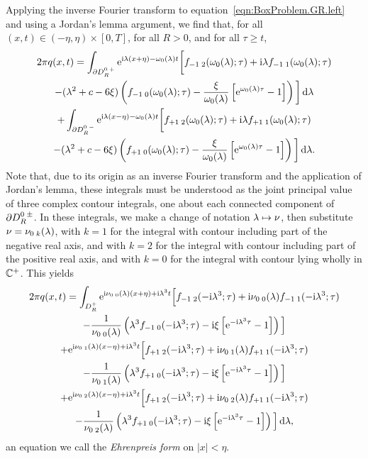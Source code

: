 \documentclass[11pt,reqno,oneside,a4paper]{article}
\begin{document}
Applying the inverse Fourier transform to equation~\eqref{eqn:BoxProblem.GR.left} and using a Jordan's lemma argument, we find that, for all $(x,t)\in(-\eta,\eta)\times[0,T]$, for all $R>0$, and for all $\tau\geq t$,
\begin{multline}
    2\pi q(x,t)
    = \int_{\partial D_{R\;}^{0\;+}} \mathrm{e}^{\mathrm{i}\lambda(x+\eta)-\omega_{0}(\lambda)t} \bigg[ f_{-1\;2}(\omega_{0}(\lambda);\tau) + \mathrm{i}\lambda f_{- 1\;1}(\omega_{0}(\lambda);\tau) \\
    - (\lambda^2+c-6\xi) \left( f_{-1\;0}(\omega_{0}(\lambda);\tau) - \frac{\xi}{\omega_0(\lambda)}\left[\mathrm{e}^{\omega_0(\lambda)\tau}-1\right] \right) \bigg] \,\mathrm{d}\lambda \\
    + \int_{\partial D_{R\;}^{0\;-}} \mathrm{e}^{\mathrm{i}\lambda(x-\eta)-\omega_{0}(\lambda)t} \bigg[ f_{+1\;2}(\omega_{0}(\lambda);\tau) + \mathrm{i}\lambda f_{+ 1\;1}(\omega_{0}(\lambda);\tau) \\
    - (\lambda^2+c-6\xi) \left( f_{+1\;0}(\omega_{0}(\lambda);\tau) - \frac{\xi}{\omega_0(\lambda)}\left[\mathrm{e}^{\omega_0(\lambda)\tau}-1\right] \right) \bigg] \,\mathrm{d}\lambda.
\end{multline}
Note that, due to its origin as an inverse Fourier transform and the application of Jordan's lemma, these integrals must be understood as the joint principal value of three complex contour integrals, one about each connected component of $\partial D_{R\;}^{0\;\pm}$.
In these integrals, we make a change of notation $\lambda\mapsto\nu$, then substitute $\nu=\nu_{0\; k}(\lambda)$, with $k=1$ for the integral with contour including part of the negative real axis, and with $k=2$ for the integral with contour including part of the positive real axis, and with $k=0$ for the integral with contour lying wholly in $\mathbb C^+$.
This yields
\begin{multline} \label{eqn:BoxProblem.EF.center}
    2\pi q(x,t)
    = \int_{D_R^+} \mathrm{e}^{\mathrm{i}\nu_{0\;0}(\lambda)(x+\eta)+\mathrm{i}\lambda^3t} \Big[ f_{-1\;2}(-\mathrm{i}\lambda^3;\tau) + \mathrm{i}\nu_{0\;0}(\lambda) f_{-1\;1}(-\mathrm{i}\lambda^3;\tau) \\
    - \frac{1}{\nu_{0\;0}(\lambda)} \left( \lambda^3f_{-1\;0}(-\mathrm{i}\lambda^3;\tau) - \mathrm{i}\xi\left[\mathrm{e}^{-\mathrm{i}\lambda^3\tau}-1\right] \right) \Big] \\
    +            \mathrm{e}^{\mathrm{i}\nu_{0\;1}(\lambda)(x-\eta)+\mathrm{i}\lambda^3t} \Big[ f_{+1\;2}(-\mathrm{i}\lambda^3;\tau) + \mathrm{i}\nu_{0\;1}(\lambda) f_{+1\;1}(-\mathrm{i}\lambda^3;\tau) \\
    - \frac{1}{\nu_{0\;1}(\lambda)} \left( \lambda^3f_{+1\;0}(-\mathrm{i}\lambda^3;\tau) - \mathrm{i}\xi\left[\mathrm{e}^{-\mathrm{i}\lambda^3\tau}-1\right] \right) \Big] \\
    +            \mathrm{e}^{\mathrm{i}\nu_{0\;2}(\lambda)(x-\eta)+\mathrm{i}\lambda^3t} \Big[ f_{+1\;2}(-\mathrm{i}\lambda^3;\tau) + \mathrm{i}\nu_{0\;2}(\lambda) f_{+1\;1}(-\mathrm{i}\lambda^3;\tau) \\
    - \frac{1}{\nu_{0\;2}(\lambda)} \left( \lambda^3f_{+1\;0}(-\mathrm{i}\lambda^3;\tau) - \mathrm{i}\xi\left[\mathrm{e}^{-\mathrm{i}\lambda^3\tau}-1\right] \right) \Big]
    \,\mathrm{d}\lambda,
\end{multline}
an equation we call the \emph{Ehrenpreis form} on $\lvert x \rvert < \eta$.
\end{document}
